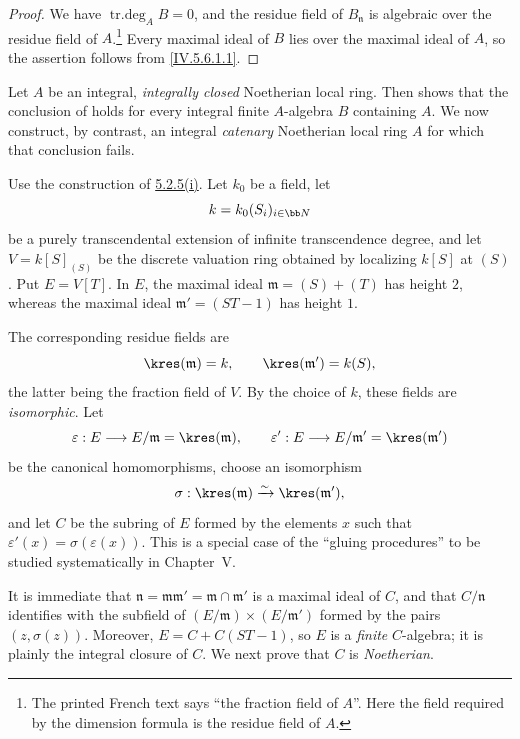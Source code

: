 \begin{proof}
We have $\operatorname{tr.deg}_A B=0$, and the residue field of
$B_{\mathfrak n}$ is algebraic over the residue field of
$A$.\footnote{The printed French text says ``the fraction field of
$A$''.  Here the field required by the dimension formula is the
residue field of $A$.}  Every maximal ideal of $B$ lies over the
maximal ideal of $A$, so the assertion follows from
\eqref{IV.5.6.1.1}.
\end{proof}

\begin{example}[5.6.11]
\label{IV.5.6.11}
Let $A$ be an integral, \emph{integrally closed} Noetherian local ring.
Then  shows that the conclusion of
 holds for every integral finite $A$-algebra $B$
containing $A$.  We now construct, by contrast, an integral
\emph{catenary} Noetherian local ring $A$ for which that conclusion fails.

Use the construction of {\hyperref[IV.5.2.5.i]{5.2.5\textup{(i)}}}.
Let $k_0$ be a field,
let
\[
k=k_0(S_i)_{i\in\bb N}
\]
be a purely transcendental extension of infinite transcendence
degree, and let $V=k[S]_{(S)}$ be the discrete valuation ring
obtained by localizing $k[S]$ at $(S)$.  Put $E=V[T]$.  In $E$, the
maximal ideal $\mathfrak m=(S)+(T)$
has height $2$, whereas the maximal ideal $\mathfrak m'=(ST-1)$
has height $1$.


The corresponding residue fields are
\[
\kres(\mathfrak m)=k,
\qquad
\kres(\mathfrak m')=k(S),
\]
the latter being the fraction field of $V$.  By the choice of $k$,
these fields are \emph{isomorphic}.  Let
\[
\varepsilon:E\longrightarrow E/\mathfrak m=\kres(\mathfrak m),
\qquad
\varepsilon':E\longrightarrow E/\mathfrak m'=\kres(\mathfrak m')
\]
be the canonical homomorphisms, choose an isomorphism
\[
\sigma:\kres(\mathfrak m)\xrightarrow{\sim}\kres(\mathfrak m'),
\]
and let $C$ be the subring of $E$ formed by the elements $x$ such
that $\varepsilon'(x)=\sigma(\varepsilon(x))$.
This is a special case of the ``gluing procedures'' to be studied
systematically in Chapter~V.

It is immediate that $\mathfrak n=\mathfrak m\mathfrak m'
=\mathfrak m\cap\mathfrak m'$
is a maximal ideal of $C$, and that $C/\mathfrak n$ identifies with
the subfield of
$(E/\mathfrak m)\times(E/\mathfrak m')$ formed by the pairs
$(z,\sigma(z))$.  Moreover, $E=C+C(ST-1)$,
so $E$ is a \emph{finite} $C$-algebra; it is plainly the integral closure
of $C$.  We next prove that $C$ is \emph{Noetherian}.


\end{example}
